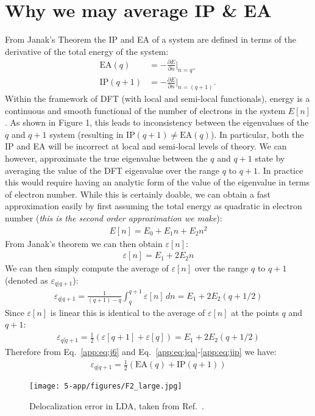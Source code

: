 \chapter{Why we may average IP \& EA}

From Janak's Theorem the IP and EA of a system are defined in terms of the derivative of the total energy of the system:
\begin{align}
    \text{EA}(q)&=-\frac{\partial E}{\partial n}
    \bigg|_{n=q^+} \label{app:eq:jea} \\
    \text{IP}(q+1)&=-\frac{\partial E}{\partial n}
    \bigg|_{n=(q+1)^-} \label{app:eq:jip}
\end{align}
Within the framework of DFT (with local and semi-local functionals), energy is a continuous and smooth functional of the number of electrons in the system $E[n]$. As shown in Figure 1, this leads to inconsistency between the eigenvalues of the $q$ and $q+1$ system (resulting in $\text{IP}(q+1)\neq\text{EA}(q)$). In particular, both the IP and EA will be incorrect at local and semi-local levels of theory. We can however, approximate the true eigenvalue between the $q$ and $q+1$ state by averaging the value of the DFT eigenvalue over the range $q$ to $q+1$. In practice this would require having an analytic form of the value of the eigenvalue in terms of electron number. While this is certainly doable, we can obtain a fast approximation easily by first assuming the total energy as quadratic in electron number (\textit{this is the second order approximation we make}):
\begin{align}
    E[n] = E_0 + E_1 n+ E_2 n^2
\end{align}
From Janak's theorem we can then obtain $\varepsilon [n]$:
\begin{align}
    \varepsilon [n] = E_1 + 2E_2 n
\end{align}
We can then simply compute the average of $\varepsilon[n]$ over the range $q$ to $q+1$ (denoted as $\varepsilon_{q|q+1}$):
\begin{align}
    \varepsilon_{q|q+1}
    = \frac{1}{(q+1)-q}\int_q^{q+1}\varepsilon[n] \, dn
    = E_1+ 2E_2 (q+1/2)
\end{align}
Since $\varepsilon[n]$ is linear this is identical to the average of $\varepsilon[n]$ at the points $q$ and $q+1$:
\begin{align}
    \varepsilon_{q|q+1}
    = \frac{1}{2}\left( \varepsilon[q+1] + \varepsilon[q] \right)
    = E_1+ 2E_2 (q+1/2)
    \label{app:eq:j6}
\end{align}
Therefore from Eq.~\ref{app:eq:j6} and Eq.~\ref{app:eq:jea}-\ref{app:eq:jip} we have:
\begin{align}
    \varepsilon_{q|q+1}
    = \frac{1}{2}\left( \text{EA}(q)+\text{IP}(q+1) \right)
\end{align}

\begin{figure}[H]
    \centering
    \texttt{[image: 5-app/figures/F2\_large.jpg]}
    \caption{Delocalization error in LDA, taken from Ref.~\cite{cohen2008insights}.}
    \label{fig:my_label}
\end{figure}
